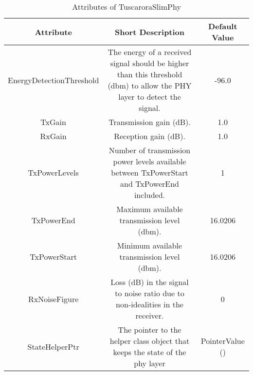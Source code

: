  \begin{longtable}{ | c | c | c |}

\caption{Attributes of TuscaroraSlimPhy}\label{table:SlimPhyTableofAttributes}	\\
 
     \hline
  \textbf{Attribute} & \textbf{Short Description} & \textbf{Default Value} \\ \hline
 
     
    
 EnergyDetectionThreshold & \parbox[][][t]{5cm}{\vspace{6pt}\raggedright The energy of a received signal should be higher than 
                   this threshold (dbm) to allow the PHY layer to detect the signal.} & 
                   -96.0 \\ \hline 

 TxGain & \parbox[][][t]{5cm}{\vspace{6pt}\raggedright Transmission gain (dB).} & 
                   1.0 \\ \hline 

 RxGain & \parbox[][][t]{5cm}{\vspace{6pt}\raggedright Reception gain (dB).} & 
                   1.0 \\ \hline 

 TxPowerLevels & \parbox[][][t]{5cm}{\vspace{6pt}\raggedright Number of transmission power levels available between 
                   TxPowerStart and TxPowerEnd included.} & 
                   1 \\ \hline 

 TxPowerEnd & \parbox[][][t]{5cm}{\vspace{6pt}\raggedright Maximum available transmission level (dbm).} & 
                   16.0206 \\ \hline 

 TxPowerStart & \parbox[][][t]{5cm}{\vspace{6pt}\raggedright Minimum available transmission level (dbm).} & 
                   16.0206 \\ \hline 

 RxNoiseFigure & \parbox[][][t]{5cm}{\vspace{6pt}\raggedright Loss (dB) in the signal to noise ratio due to non-idealities in the receiver.} & 
                   0 \\ \hline 

 StateHelperPtr & \parbox[][][t]{5cm}{\vspace{6pt}\raggedright The pointer to the helper class object that keeps the state of the phy layer} & 
                   PointerValue () \\ \hline 


\end{longtable}
